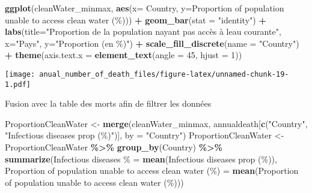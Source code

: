 \documentclass[
]{article}
\newenvironment{Shaded}{\begin{snugshade}}{\end{snugshade}}
\newcommand{\AttributeTok}[1]{\textcolor[rgb]{0.13,0.29,0.53}{#1}}
\newcommand{\DecValTok}[1]{\textcolor[rgb]{0.00,0.00,0.81}{#1}}
\newcommand{\FunctionTok}[1]{\textcolor[rgb]{0.13,0.29,0.53}{\textbf{#1}}}
\newcommand{\NormalTok}[1]{#1}
\newcommand{\OtherTok}[1]{\textcolor[rgb]{0.56,0.35,0.01}{#1}}
\newcommand{\SpecialCharTok}[1]{\textcolor[rgb]{0.81,0.36,0.00}{\textbf{#1}}}
\newcommand{\StringTok}[1]{\textcolor[rgb]{0.31,0.60,0.02}{#1}}
\begin{document}
\begin{Shaded}
\begin{Highlighting}[]
\FunctionTok{ggplot}\NormalTok{(cleanWater\_minmax, }\FunctionTok{aes}\NormalTok{(}\AttributeTok{x=}\NormalTok{ Country, }\AttributeTok{y=}\StringTok{\textasciigrave{}}\AttributeTok{Proportion of population unable to access clean water (\%)}\StringTok{\textasciigrave{}}\NormalTok{)) }\SpecialCharTok{+} \FunctionTok{geom\_bar}\NormalTok{(}\AttributeTok{stat =} \StringTok{"identity"}\NormalTok{) }\SpecialCharTok{+} \FunctionTok{labs}\NormalTok{(}\AttributeTok{title=}\StringTok{"Proportion de la population n\textquotesingle{}ayant pas accès à l\textquotesingle{}eau courante"}\NormalTok{, }\AttributeTok{x=}\StringTok{"Pays"}\NormalTok{, }\AttributeTok{y=}\StringTok{"Proportion (en \%)"}\NormalTok{) }\SpecialCharTok{+} \FunctionTok{scale\_fill\_discrete}\NormalTok{(}\AttributeTok{name =} \StringTok{"Country"}\NormalTok{) }\SpecialCharTok{+}
  \FunctionTok{theme}\NormalTok{(}\AttributeTok{axis.text.x =} \FunctionTok{element\_text}\NormalTok{(}\AttributeTok{angle =} \DecValTok{45}\NormalTok{, }\AttributeTok{hjust =} \DecValTok{1}\NormalTok{))}
\end{Highlighting}
\end{Shaded}

\texttt{[image: anual\_number\_of\_death\_files/figure-latex/unnamed-chunk-19-1.pdf]}

Fusion avec la table des morts afin de filtrer les données

\begin{Shaded}
\begin{Highlighting}[]
\NormalTok{ProportionCleanWater }\OtherTok{\textless{}{-}} \FunctionTok{merge}\NormalTok{(cleanWater\_minmax, annualdeath[}\FunctionTok{c}\NormalTok{(}\StringTok{"Country"}\NormalTok{, }\StringTok{"Infectious diseases prop (\%)"}\NormalTok{)], }\AttributeTok{by =} \StringTok{"Country"}\NormalTok{)}
\NormalTok{ProportionCleanWater }\OtherTok{\textless{}{-}}\NormalTok{ ProportionCleanWater }\SpecialCharTok{\%\textgreater{}\%} \FunctionTok{group\_by}\NormalTok{(Country) }\SpecialCharTok{\%\textgreater{}\%} \FunctionTok{summarize}\NormalTok{(}\StringTok{\textasciigrave{}}\AttributeTok{Infectious diseases \%}\StringTok{\textasciigrave{}} \OtherTok{=} \FunctionTok{mean}\NormalTok{(}\StringTok{\textasciigrave{}}\AttributeTok{Infectious diseases prop (\%)}\StringTok{\textasciigrave{}}\NormalTok{), }\StringTok{\textasciigrave{}}\AttributeTok{Proportion of population unable to access clean water (\%)}\StringTok{\textasciigrave{}} \OtherTok{=} \FunctionTok{mean}\NormalTok{(}\StringTok{\textasciigrave{}}\AttributeTok{Proportion of population unable to access clean water (\%)}\StringTok{\textasciigrave{}}\NormalTok{))}
\end{Highlighting}
\end{Shaded}
\end{document}
